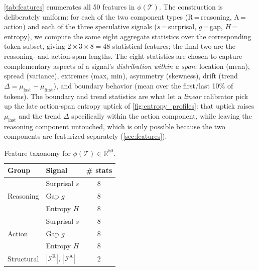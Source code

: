 \documentclass[11pt]{article}
\newcommand{\Hnumber}[1]{#1}
\begin{document}
\autoref{tab:features} enumerates all \Hnumber{50} features in $\phi(\mathcal{T})$. The construction is
deliberately uniform: for each of the two component types ($\mathrm{R}$\,=\,reasoning,
$\mathrm{A}$\,=\,action) and each of the three speculative signals ($s$\,=\,surprisal, $g$\,=\,gap,
$H$\,=\,entropy), we compute the same eight aggregate statistics over the corresponding token subset,
giving $2\times3\times8=48$ statistical features; the final two are the reasoning- and action-span
lengths. The eight statistics are chosen to capture complementary aspects of a signal's
\emph{distribution within a span}: location (mean), spread (variance), extremes (max, min), asymmetry
(skewness), drift (trend $\Delta=\mu_\text{last}-\mu_\text{first}$), and boundary behavior (mean over the
first/last 10\% of tokens). The boundary and trend statistics are what let a \emph{linear} calibrator pick
up the late action-span entropy uptick of \autoref{fig:entropy_profiles}: that uptick raises
$\mu_\text{last}$ and the trend $\Delta$ specifically within the action component, while leaving the
reasoning component untouched, which is only possible because the two components are featurized
separately (\autoref{sec:features}).

\begin{table}[h]
\centering
\caption{Feature taxonomy for $\phi(\mathcal{T}) \in \mathbb{R}^{50}$.}
\label{tab:features}
\small
\setlength{\tabcolsep}{6pt}
\renewcommand{\arraystretch}{1.2}
\begin{tabular}{@{}llc@{}}
\toprule
\textbf{Group} & \textbf{Signal} & \textbf{\# stats} \\
\midrule
\multirow{3}{*}{Reasoning}
  & Surprisal $s$ & 8 \\
  & Gap $g$       & 8 \\
  & Entropy $H$   & 8 \\
\midrule
\multirow{3}{*}{Action}
  & Surprisal $s$ & 8 \\
  & Gap $g$       & 8 \\
  & Entropy $H$   & 8 \\
\midrule
Structural & $|\mathcal{I}^\mathrm{R}|,\ |\mathcal{I}^\mathrm{A}|$ & 2 \\
\bottomrule
\end{tabular}
\end{table}
\end{document}
